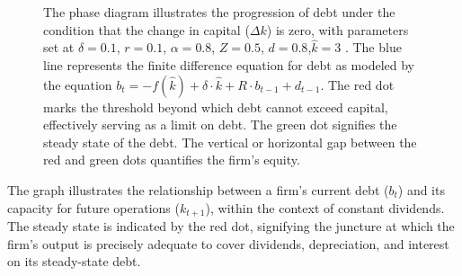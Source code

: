 \documentclass[12pt]{article}
\begin{document}
\begin{figure}
    \centering
    \caption{The phase diagram illustrates the progression of debt under the condition that the change in capital (\(\Delta k\))
    is zero, with parameters set at \(\delta = 0.1\), \(r = 0.1\), \(\alpha = 0.8\), \(Z = 0.5\), \(d = 0.8\),\(\widehat{k} = 3\) . The
    blue line represents the finite difference equation for debt as modeled by the equation \(b_{t} =  - f(\widehat{k}) + \delta \cdot \widehat{k} + R
    \cdot b_{t-1} + d_{t-1}\). The red dot marks the threshold beyond which debt cannot exceed capital, effectively serving
    as a limit 
    on debt. The green dot signifies the steady state of the debt. The vertical or horizontal gap between the red and
    green dots quantifies the firm's equity. 
    }
\end{figure}
The graph illustrates the relationship between a firm's current debt (\(b_t\)) and its capacity for future operations
(\(k_{t+1}\)), within the context of constant dividends. The steady state is indicated by the red dot, signifying the
juncture at which the firm's output is precisely adequate to cover dividends, depreciation, and interest on its
steady-state debt. 
\end{document}
